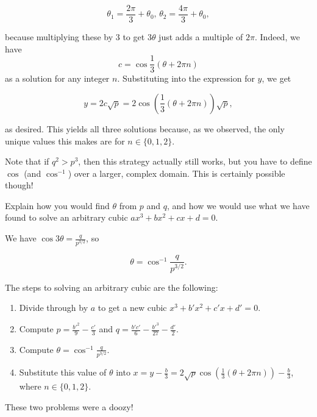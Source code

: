 \documentclass[../key.tex]{subfiles}
\begin{document}
$$\theta_1 = \frac{2\pi}{3} + \theta_0, \, \theta_2 = \frac{4\pi}{3} + \theta_0,$$

because multiplying these by $3$ to get $3\theta$ just adds a multiple of $2\pi$. Indeed, we have $$c = \cos\frac{1}{3}\left(\theta + 2\pi n\right)$$ as a solution for any integer $n$. Substituting into the expression for $y$, we get

$$y=2c\sqrt{p}=2\cos\left(\frac{1}{3}(\theta + 2\pi n)\right)\sqrt{p},$$

as desired. This yields all three solutions because, as we observed, the only unique values this makes are for $n\in \{0,1,2\}$.

Note that if $q^2 > p^3$, then this strategy actually still works, but you have to define $\cos$ (and $\cos^{-1}$) over a larger, complex domain. This is certainly possible though!

\begin{inner_problem}
\item Explain how you would find $\theta$ from $p$ and $q$, and how we would use what we have found to solve an arbitrary cubic $ax^3+bx^2+cx+d=0$.
\end{inner_problem}

We have $\cos 3\theta = \frac{q}{p^{3/2}}$, so

$$\theta = \cos^{-1} \frac{q}{p^{3/2}}.$$

The steps to solving an arbitrary cubic are the following:

\begin{enumerate}
\item Divide through by $a$ to get a new cubic $x^3 + b'x^2 + c'x + d' = 0$.
\item Compute $p = \frac{b'^2}{9} - \frac{c'}{3}$ and $q=\frac{b'c'}{6} - \frac{b'^3}{27} - \frac{d'}{2}$.
\item Compute $\theta = \cos^{-1} \frac{q}{p^{3/2}}$.
\item Substitute this value of $\theta$ into $x=y-\frac{b}{3}=2\sqrt{p}\cos\left(\frac{1}{3}(\theta+2\pi n)\right)-\frac{b}{3}$, where $n\in \{0,1,2\}$.
\end{enumerate}

These two problems were a doozy!
\end{document}
